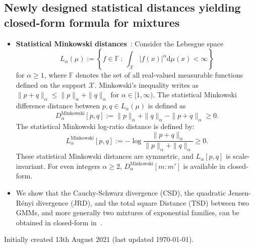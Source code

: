 \documentclass[11pt]{article}
\def\st{\ :\ }
\def\bbF{\mathbb{F}}
\def\eqdef{:=}
\def\dmu{\mathrm{d}\mu}
\def\calX{\mathcal{X}}
\def\calX{\mathcal{X}}
\def\dmu{\mathrm{d}\mu}
\begin{document}


\subsection{Newly designed statistical distances yielding closed-form formula for mixtures}\label{sec:mix:newdist}


\begin{itemize}
	\item {\bf Statistical Minkowski distances}~\cite{StatMinkGMM-2019}:
	Consider the   Lebesgue space 
	$$
	L_\alpha(\mu)  \eqdef \left\{ f\in \bbF \st  \int_\calX |f(x)|^\alpha \dmu(x) <\infty \right\}
	$$  
	for $\alpha\geq 1$, where   $\bbF$ denotes the set of all real-valued measurable functions defined on the support $\calX$. Minkowski's inequality writes as
$\|p+q\|_\alpha \leq \|p\|_\alpha+\|q\|_\alpha$ for $\alpha\in [1,\infty)$.
 The statistical Minkowski difference distance between $p,q\in L_\alpha(\mu)$ is defined as
\begin{equation}
D_\alpha^{\mathrm{Minkowski}}[p,q] \eqdef \|p\|_\alpha+\|q\|_\alpha - \|p+q\|_\alpha\geq 0.
\end{equation}
The statistical Minkowski log-ratio distance is defined by:
\begin{equation}
L_\alpha^{\mathrm{Minkowski}}[p,q] \eqdef -\log \frac{\|p+q\|_\alpha}{\|p\|_\alpha+\|q\|_\alpha}\geq 0.
\end{equation}
These statistical Minkowski distances are symmetric, and $L_\alpha[p,q]$ is scale-invariant.
For even integers $\alpha\geq 2$, $D_\alpha^{\mathrm{Minkowski}}[m:m']$ is available in closed-form.


\item We show that the Cauchy-Schwarz divergence (CSD), the quadratic Jensen-R\'enyi divergence (JRD), and the total square Distance (TSD) between two GMMs, and more generally two mixtures of exponential families, can be obtained in closed-form in~\cite{nielsen2012closed}.
\end{itemize}



%
%
%
%

\vskip 1cm
Initially created 13th August 2021 (last updated \today).



\end{document}
